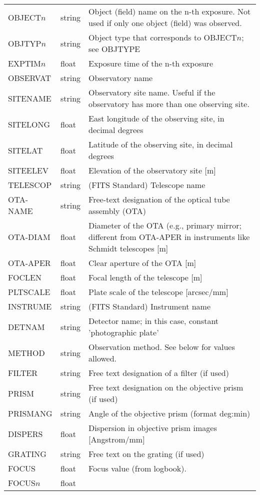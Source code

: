 \documentclass[11pt]{ivoa}
\begin{document}
\begin{longtable}{llp{}}
OBJECT$n$ &string  &
    Object (field) name on the n-th exposure. Not used if only
    one object (field) was observed.\\
OBJTYP$n$ &string  &Object type that corresponds to
OBJECT$n$; see OBJTYPE\\
EXPTIM$n$ &float   & Exposure time of the n-th exposure\\
OBSERVAT  &string  &Observatory name\\
SITENAME  &string  &
  Observatory site name. Useful if the observatory has more than one
  observing site.\\
SITELONG  &float   &
  East longitude of the observing site, in decimal degrees\\
SITELAT   &float   &
  Latitude of the observing site, in decimal degrees\\
SITEELEV  &float   &
  Elevation of the observatory site [m]\\
TELESCOP  &string  &(FITS Standard) Telescope name\\
OTA-NAME  &string  &Free-text designation of the optical tube assembly (OTA)\\
OTA-DIAM  &float   &Diameter of the OTA (e.g., primary mirror; different
from OTA-APER in instruments like Schmidt telescopes [m]\\
OTA-APER  &float   &Clear aperture of the OTA [m]\\
FOCLEN    &float   &Focal length of the telescope [m]\\
PLTSCALE  &float   &Plate scale of the telescope [arcsec/mm]\\
INSTRUME  &string  &(FITS Standard) Instrument name\\
DETNAM    &string  &Detector name; in this case, constant 'photographic plate'\\
METHOD    &string  &
  Observation method.  See below for values allowed.\\
FILTER    &string  &Free text designation of a filter (if used)\\
PRISM     &string  &
  Free text designation on the objective prism (if used)\\
PRISMANG  &string  &
  Angle of the objective prism (format deg:min)\\
DISPERS   &float   &Dispersion in objective prism images [Angstrom/mm]\\
GRATING   &string  &Free text on the grating (if used)\\
FOCUS     &float   & Focus value (from logbook).\\
FOCUS$n$  &float   &

\end{longtable}
\end{document}
